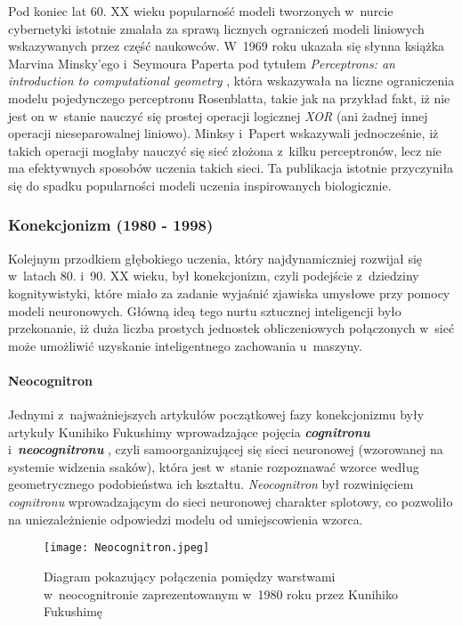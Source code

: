 Pod koniec lat 60. XX wieku popularność modeli tworzonych w~nurcie cybernetyki istotnie zmalała za sprawą licznych ograniczeń modeli liniowych wskazywanych przez część naukowców. W~1969 roku ukazała się słynna książka Marvina Minsky'ego i~Seymoura Paperta pod tytułem \emph{Perceptrons: an introduction to computational geometry} \cite{minsky}, która wskazywała na liczne ograniczenia modelu pojedynczego perceptronu Rosenblatta, takie jak na przykład fakt, iż nie jest on w~stanie nauczyć się prostej operacji logicznej \emph{XOR} (ani żadnej innej operacji nieseparowalnej liniowo). Minksy i~Papert wskazywali jednocześnie, iż takich operacji mogłaby nauczyć się sieć złożona z~kilku perceptronów, lecz nie ma efektywnych sposobów uczenia takich sieci. Ta publikacja istotnie przyczyniła się do spadku popularności modeli uczenia inspirowanych biologicznie. 

\subsubsection{Konekcjonizm (1980 - 1998)}

Kolejnym przodkiem głębokiego uczenia, który najdynamiczniej rozwijał się  w~latach 80. i~90. XX wieku, był konekcjonizm, czyli podejście z~dziedziny kognitywistyki, które miało za zadanie wyjaśnić zjawiska umysłowe przy pomocy modeli neuronowych. Główną ideą tego nurtu sztucznej inteligencji było przekonanie, iż duża liczba prostych jednostek obliczeniowych połączonych w~sieć może umożliwić uzyskanie inteligentnego zachowania u~maszyny. 

\paragraph*{Neocognitron}

Jednymi z~najważniejszych artykułów początkowej fazy konekcjonizmu były artykuły Kunihiko Fukushimy wprowadzające pojęcia \textbf{\emph{cognitronu}} \cite{fukushima1} i~\textbf{\emph{neocognitronu}} \cite{fukushima2}, czyli samoorganizującej się sieci neuronowej (wzorowanej na systemie widzenia ssaków), która jest w~stanie rozpoznawać wzorce według geometrycznego podobieństwa ich kształtu. \emph{Neocognitron} był rozwinięciem \emph{cognitronu} wprowadzającym do sieci neuronowej charakter splotowy, co pozwoliło na uniezależnienie odpowiedzi modelu od umiejscowienia wzorca.  

\begin{figure}[!h]
    \centering \texttt{[image: Neocognitron.jpeg]}
    \captionsetup{format=hang}
    \caption{Diagram pokazujący połączenia pomiędzy warstwami w~neocognitronie zaprezentowanym w~1980 roku przez Kunihiko Fukushimę \cite{fukushima2}}
    \label{fig:neocognitron1}
\end{figure}

